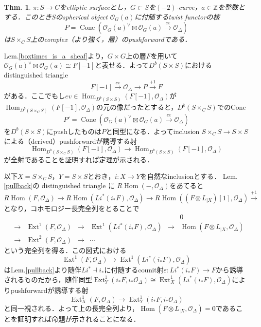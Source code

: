 \documentclass[uplatex,a4paper,11pt,dvipdfmx]{jsarticle}
\makeatletter
\theoremstyle{mystyle} %
\newtheorem{theorem}{Thm.}[section]
\renewenvironment{proof}[1][\proofname]{\par
 \pushQED{\qed}%
 \normalfont \topsep6\p@\@plus6\p@\relax
 \trivlist
 \item[\hskip\labelsep
 \itshape
 {\bf\underline{#1}}]\ignorespaces
}{%
 \popQED\endtrivlist\@endpefalse
}
\DeclareMathOperator{\Hom}{Hom}
\DeclareMathOperator{\Ext}{Ext}
\DeclareMathOperator{\Cone}{Cone}
\makeatother
\begin{document}
\begin{theorem}
	$\pi \colon S \to C$をelliptic surfaceとし，$G \subset S$を$(-2)$-curve，$a \in \mathbb{Z}$を整数とする．このとき$S$のspherical object $\mathcal{O}_G(a)$に付随するtwist functorの核$$P = \Cone(\mathcal{O}_G(a)^\vee \boxtimes \mathcal{O}_G(a) \xrightarrow{ev} \mathcal{O}_\Delta)$$は$S\times_C S$上のcomplex（より強く，層）のpushforwardである．
\end{theorem}
\begin{proof}
	Lem.\ref{boxtimes_is_a_sheaf}より，$G\times G$上の層$F$を用いて$\mathcal{O}_G(a)^\vee \boxtimes \mathcal{O}_G(a)\cong F[-1]$と表せる．よって$D^b(S \times S)$におけるdistinguished triangle$$F[-1] \xrightarrow{ev} \mathcal{O}_\Delta \to P \xrightarrow{+1} F$$がある．ここでもし$ev \in \Hom_{D^b(S\times S)}(F[-1], \mathcal{O}_\Delta)$が$\Hom_{D^b(S\times_C S)}(F[-1], \mathcal{O}_\Delta)$の元の像だったとすると，$D^b(S\times_C S)$でのCone$$P' = \Cone(\mathcal{O}_G(a)^\vee \boxtimes \mathcal{O}_G(a) \xrightarrow{ev} \mathcal{O}_\Delta)$$を$D^b(S\times S)$にpushしたものは$P$と同型になる．よってinclusion $S\times_C S \to S\times S$による（derived）pushforwardが誘導する射$$\Hom_{D^b(S\times_C S)}(F[-1], \mathcal{O}_\Delta) \to \Hom_{D^b(S\times S)}(F[-1], \mathcal{O}_\Delta)$$が全射であることを証明すれば定理が示される．

	以下$X=S\times_C S$，$ Y=S\times S$とおき，$i \colon X \to Y$を自然なinclusionとする．
	Lem.\ref{pullback}の distinguished triangle に $R\Hom(-, \mathcal{O}_\Delta)$をあてると
	$$R\Hom(F, \mathcal{O}_\Delta) \to R\Hom(Li^*(i_*F), \mathcal{O}_\Delta) \to R\Hom((F\otimes L_{|X})[1], \mathcal{O}_\Delta) \xrightarrow{+1}$$
	となり，コホモロジー長完全列をとることで
	\[
		\begin{array}{ccccccc}
			 &     &                               &     &                                        &     & 0                                         \\
			 & \to & \Ext^1(F, \mathcal{O}_\Delta) & \to & \Ext^1(Li^*(i_*F), \mathcal{O}_\Delta) & \to & \Hom(F\otimes L_{|X}, \mathcal{O}_\Delta) \\
			 & \to & \Ext^2(F, \mathcal{O}_\Delta) & \to & \cdots                                 &     &
		\end{array}
	\]
	という完全列を得る．この図式における$$\Ext^1(F, \mathcal{O}_\Delta) \to \Ext^1(Li^*(i_*F), \mathcal{O}_\Delta)$$はLem.\ref{pullback}より随伴$Li^* \dashv i_*$に付随するcounit射$\varepsilon \colon Li^*(i_*F) \to F$から誘導されるものだから，随伴同型$\Ext_Y^1(i_*F, i_*\mathcal{O}_\Delta) \cong \Ext_X^1(Li^*(i_*F), \mathcal{O}_\Delta)$によりpushforwardが誘導する射$$\Ext_X^1(F, \mathcal{O}_\Delta) \to \Ext_Y^1(i_*F, i_*\mathcal{O}_\Delta)$$と同一視される．よって上の長完全列より，$\Hom(F\otimes L_{|X}, \mathcal{O}_\Delta) =0$であることを証明すれば命題が示されることになる．


\end{proof}
\end{document}
